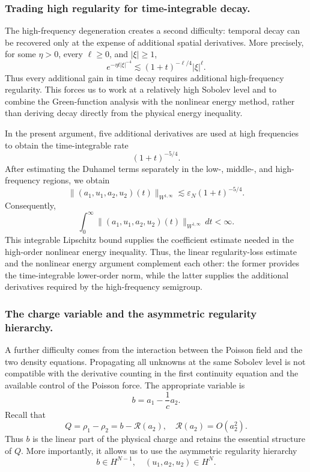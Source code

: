 \documentclass[10pt,reqno]{amsart}
\numberwithin{equation}{section}
\begin{document}
%
%
%
%
%
%


\subsubsection*{Trading high regularity for time-integrable decay.}

The high-frequency degeneration creates a second difficulty: temporal decay can be recovered only at the expense of additional spatial derivatives. More precisely, for some $ \eta >0$, every $\ell\ge0$, and $|\xi|\ge1$,
\[
e^{- \eta  t|\xi|^{-4}} \lesssim (1+t)^{-\ell/4}|\xi|^\ell.
\]
Thus every additional gain in time decay requires additional high-frequency regularity. This forces us to work at a relatively high Sobolev level and to combine the Green-function analysis with the nonlinear energy method, rather than deriving decay directly from the physical energy inequality.

In the present argument, five additional derivatives are used at high frequencies to obtain the time-integrable rate
\[
(1+t)^{-5/4}.
\]
After estimating the Duhamel terms separately in the low-, middle-, and high-frequency regions, we obtain
\[
\|(a_1,u_1,a_2,u_2)(t)\|_{W^{1,\infty}} \lesssim \varepsilon_N(1+t)^{-5/4}.
\]
Consequently,
\[
\int_0^\infty \|(a_1,u_1,a_2,u_2)(t)\|_{W^{1,\infty}}\,dt<\infty.
\]
This integrable Lipschitz bound supplies the coefficient estimate needed in the high-order nonlinear energy inequality. Thus, the linear regularity-loss estimate and the nonlinear energy argument complement each other: the former provides the time-integrable lower-order norm, while the latter supplies the additional derivatives required by the high-frequency semigroup.

%
%
%
%
%
%


\subsubsection*{The charge variable and the asymmetric regularity hierarchy.}

A further difficulty comes from the interaction between the Poisson field and the two density equations. Propagating all unknowns at the same Sobolev level is not compatible with the derivative counting in the first continuity equation and the available control of the Poisson force. The appropriate variable is
\[
b=a_1-\frac1c a_2.
\]
Recall that
\[
Q=\rho_1-\rho_2=b-\mathcal R(a_2), \quad \mathcal R(a_2)=O(a_2^2).
\]
Thus $b$ is the linear part of the physical charge and retains the essential structure of $Q$. More importantly, it allows us to use the asymmetric regularity hierarchy
\[
b\in H^{N-1}, \quad (u_1,a_2,u_2)\in H^N.
\]
\end{document}
